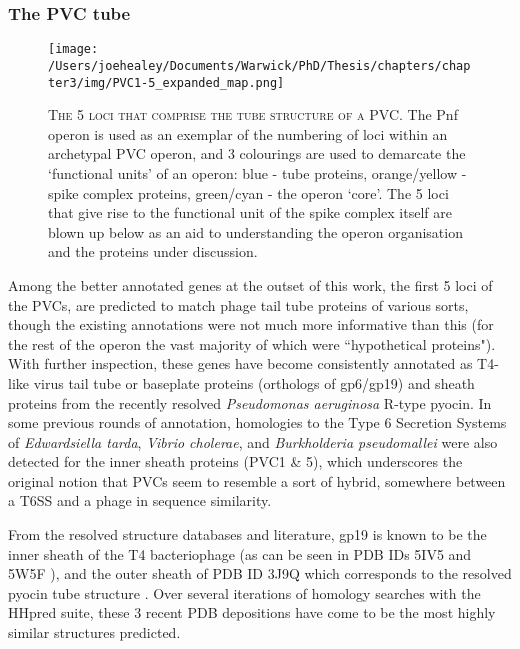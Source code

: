 \subsubsection{The PVC tube}
\begin{figure}[h!]
\texttt{[image: /Users/joehealey/Documents/Warwick/PhD/Thesis/chapters/chapter3/img/PVC1-5\_expanded\_map.png]}
	\captionsetup{singlelinecheck=off, justification=justified, font=footnotesize, aboveskip=10pt}
	\caption[Tube protein region of a PVC operon]{\textsc{\normalsize The 5 loci that comprise the tube structure of a PVC.}\vspace{0.1cm} \newline The Pnf operon is used as an exemplar of the numbering of loci within an archetypal PVC operon, and 3 colourings are used to demarcate the `functional units' of an operon: blue - tube proteins, orange/yellow - spike complex proteins, green/cyan - the operon `core'. The 5 loci that give rise to the functional unit of the spike complex itself are blown up below as an aid to understanding the operon organisation and the proteins under discussion.}
	\label{PVC1-5map}
\end{figure}


Among the better annotated genes at the outset of this work, the first 5 loci of the PVCs, are predicted to match phage tail tube proteins of various sorts, though the existing annotations were not much more informative than this (for the rest of the operon the vast majority of which were ``hypothetical proteins"). With further inspection, these genes have become consistently annotated as T4-like virus tail tube or baseplate proteins (orthologs of gp6/gp19) and sheath proteins from the recently resolved \emph{Pseudomonas aeruginosa} R-type pyocin. In some previous rounds of annotation, homologies to the Type 6 Secretion Systems of \emph{Edwardsiella tarda}, \emph{Vibrio cholerae}, and \emph{Burkholderia pseudomallei} were also detected for the inner sheath proteins (PVC1 \& 5), which underscores the original notion that PVCs seem to resemble a sort of hybrid, somewhere between a T6SS and a phage in sequence similarity.


From the resolved structure databases and literature, gp19 is known to be the inner sheath of the T4 bacteriophage (as can be seen in PDB IDs 5IV5 and 5W5F \citep{Taylor2016, Zheng2017}), and the outer sheath of PDB ID 3J9Q which corresponds to the resolved pyocin tube structure \citep{Ge2015a}. Over several iterations of homology searches with the HHpred suite, these 3 recent PDB depositions have come to be the most highly similar structures predicted.

